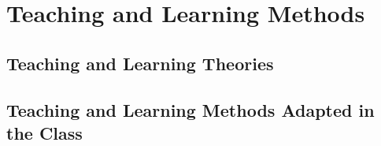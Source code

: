 \chapter{Teaching and Learning Methods}
\section{Teaching and Learning Theories}
\section{Teaching and Learning Methods Adapted in the Class}

